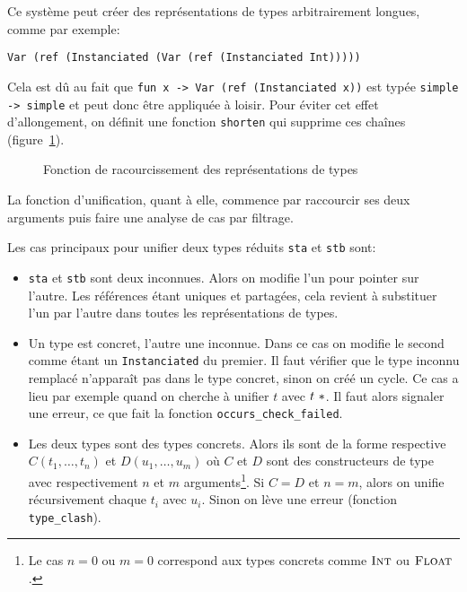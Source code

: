 Ce système peut créer des représentations de types arbitrairement longues, comme
par exemple:

\texttt{Var (ref (Instanciated (Var (ref (Instanciated Int)))))}

Cela est dû au fait que \texttt{fun x -> Var (ref (Instanciated x))} est typée
\texttt{simple -> simple} et peut donc être appliquée à loisir. Pour éviter cet
effet d'allongement, on définit une fonction \texttt{shorten} qui supprime ces
chaînes (figure~\ref{fig:implem-shorten}).

\begin{figure}


\caption{Fonction de racourcissement des représentations de types}
\label{fig:implem-shorten}
\end{figure}

La fonction d'unification, quant à elle, commence par raccourcir ses deux
arguments puis faire une analyse de cas par filtrage.

Les cas principaux pour unifier deux types réduits \texttt{sta} et \texttt{stb}
sont:

\begin{itemize}

\item \texttt{sta} et \texttt{stb} sont deux inconnues. Alors on modifie l'un
  pour pointer sur l'autre. Les références étant uniques et partagées, cela
  revient à substituer l'un par l'autre dans toutes les représentations de
  types.

\item Un type est concret, l'autre une inconnue. Dans ce cas on modifie le
  second comme étant un \texttt{Instanciated} du premier. Il faut vérifier que
  le type inconnu remplacé n'apparaît pas dans le type concret, sinon on créé un
  cycle. Ce cas a lieu par exemple quand on cherche à unifier $t$ avec
  $t~*$. Il faut alors signaler une erreur, ce que fait la fonction
  \texttt{occurs\_check\_failed}.

\item Les deux types sont des types concrets. Alors ils sont de la forme
  respective
  $C (t_1, …, t_n)$
  et
  $D (u_1, …, u_m)$ où $C$ et $D$ sont des constructeurs de type avec
  respectivement $n$ et $m$ arguments\footnote{
    Le cas $n = 0$ ou $m = 0$ correspond aux types concrets comme $\textsc{Int}$ ou
    $\textsc{Float}$.
  }. Si $C = D$ et
  $n = m$, alors on unifie récursivement chaque $t_i$ avec $u_i$. Sinon on lève
  une erreur (fonction \texttt{type\_clash}).

\end{itemize}

